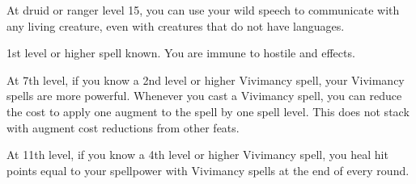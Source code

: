     At druid or ranger level 15, you can use your wild speech to communicate with any living creature, even with creatures that do not have languages.

    \featpres 1st level or higher  spell known.
    \featben You are immune to hostile  and  effects.

    At 7th level, if you know a 2nd level or higher Vivimancy spell, your Vivimancy spells are more powerful.
    Whenever you cast a Vivimancy spell, you can reduce the cost to apply one augment to the spell by one spell level.
    This does not stack with augment cost reductions from other feats.

    At 11th level, if you know a 4th level or higher Vivimancy spell, you heal hit points equal to your spellpower with Vivimancy spells at the end of every round.

